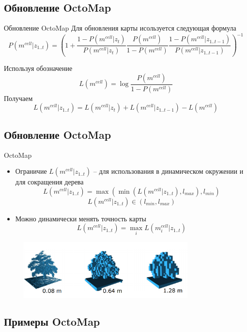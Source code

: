 \documentclass[9pt]{beamer}
\begin{document}
\subsection{Обновление OctoMap}

\begin{frame}{Обновление OctoMap}
  Для обновления карты исользуется следующая формула
  $$P(m^{cell}| z_{1..t}) = \left(1 + \frac{1- P(m^{cell} | z_{t})}{P(m^{cell} | z_{t})}  \frac{P(m^{cell})}{1 - P(m^{cell})} 
   \frac{1- P(m^{cell} | z_{1..t-1})} {P(m^{cell} | z_{1..t-1})}\right)^{-1}$$

  Используя обозначение 
  $$L(m^{cell})= \log{ \frac{P(m^{cell})}{1 - P(m^{cell})} }$$
  Получаем
  $$L(m^{cell}| z_{1..t})= L(m^{cell} | z_t) + L(m^{cell} | z_{1..t-1}) - L(m^{cell})$$

\end{frame}

\subsection{Обновление OctoMap}

\begin{frame}{OctoMap}
  \begin{itemize}
  \item
  {
    Ограничие $L(m^{cell}| z_{1..t})$ -- для использования в динамическом окружении и для сокращения дерева
    $$L(m^{cell}| z_{1..t}) = \max( \min(L(m^{cell}| z_{1..t}), l_{max}), l_{min})$$
    $$L(m^{cell}| z_{1..t}) \in (l_{min}, l_{max})$$
  }
  \item
  {
    Можно динамически менять точность карты
    $$L(m^{cell}| z_{1..t}) = \max_{i}{L(m_{i}^{cell}| z_{1..t})}$$
  }
  \end{itemize}
  \begin{figure}[h]
    \centering
    \includegraphics[width=0.8\textwidth]{octomap_multi_res.png}
  \end{figure}
\end{frame}

\subsection{Примеры OctoMap}
\end{document}
